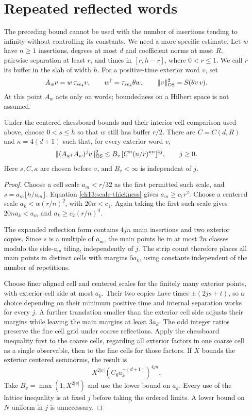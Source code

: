 \section{Repeated reflected words}
\label{ch13:repeated}

The preceding bound cannot be used with the number of insertions tending to infinity
without controlling its constants. We need a more specific estimate.
Let $w$ have $n\ge1$ insertions, degrees at most $d$ and coefficient
norms at most $R$,
pairwise separation at least $r$, and times in $[r,h-r]$, where
$0<r\le1$. We call $r$ its buffer in the slab of width $h$.
For a positive-time exterior word $v$, set
\[
 A_wv=w\,\tau_{se_4}v,\qquad w^\dagger=\tau_{se_4}\theta w,
 \qquad \|v\|_{\rm OS}^2=S(\theta v\,v).
\]
At this point $A_w$ acts only on words; boundedness on a Hilbert
space is not assumed.

\begin{proposition}
\label{ch13:word-bound}
Under the centered chessboard bounds and their interior-cell
comparison used above, choose $0<s\le h$ so that $w$ still has
buffer $r/2$. There are $C=C(d,R)$ and $\kappa=4(d+1)$ such that,
for every exterior word $v$,
\[
 \|(A_{w^\dagger}A_w)^jv\|_{\rm OS}^2
       \le B_v\,[C^n(n/r)^{\kappa n}]^{4j},\qquad j\ge0.
\]
Here $s,C,\kappa$ are chosen before $v$, and $B_v<\infty$ is
independent of $j$.
\end{proposition}
\begin{proof}
Choose a cell scale $a_m<r/32$ as the first permitted such scale,
and $s=a_m\lfloor h/a_m\rfloor$. Equation
\eqref{ch13:scale-thickness} gives $a_m\ge c_1r^2$.
Choose a centered scale $a_k<\alpha(r/n)^2$, with $20\alpha<c_1$.
Again taking the first such scale gives
$20na_k<a_m$ and $a_k\ge c_2(r/n)^4$.

The expanded reflection form contains $4jn$ main insertions and two
exterior copies. Since $s$ is a multiple of $a_m$, the main points
lie in at most $2n$ classes modulo the side-$a_m$ tiling,
independently of $j$. The strip count therefore places all main
points in distinct cells with margins $5a_k$, using constants
independent of the number of repetitions.

Choose finer aligned cell and centered scales for the finitely many
exterior points, with exterior cell side at most $a_k$.
Their two copies have times $\pm(2js+t)$, so a
choice depending on their minimum positive time and internal
separation works for every $j$. A further translation smaller than
the exterior cell side adjusts their margins while leaving the main
margins at least $3a_k$. The odd integer ratios preserve the fine
cell grid under coarse reflections. Apply the chessboard inequality
first to the coarse cells, regarding all exterior factors in one
coarse cell as a single observable, then to the fine cells for those
factors. If $X$ bounds the exterior centered seminorms, the result is
\[
 X^{2|v|}(C_0a_k^{-(d+1)})^{4jn}.
\]
Take $B_v=\max(1,X^{2|v|})$ and use the lower bound on $a_k$.
Every use of the lattice inequality is at fixed $j$ before taking
the ordered limits. A lower bound on $N$ uniform in $j$ is unnecessary.
\end{proof}

